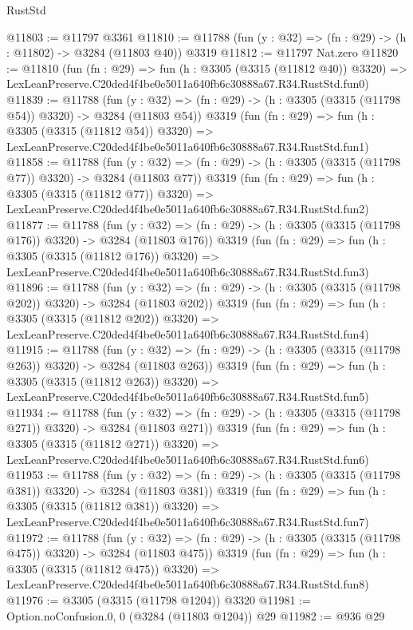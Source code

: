 \begin{lexlean}{RustStd}
\begin{coremodule}
@11803 := @11797 @3361
@11810 := @11788 (fun (y : @32) => (fn : @29) -> (h : @11802) -> @3284 (@11803 @40)) @3319
@11812 := @11797 Nat.zero
@11820 := @11810
    (fun (fn : @29) =>
    fun (h : @3305 (@3315 (@11812 @40)) @3320) =>
    LexLeanPreserve.C20ded4f4be0e5011a640fb6c30888a67.R34.RustStd.fun0)
@11839 := @11788
    (fun (y : @32) => (fn : @29) -> (h : @3305 (@3315 (@11798 @54)) @3320) -> @3284 (@11803 @54))
    @3319
    (fun (fn : @29) =>
    fun (h : @3305 (@3315 (@11812 @54)) @3320) =>
    LexLeanPreserve.C20ded4f4be0e5011a640fb6c30888a67.R34.RustStd.fun1)
@11858 := @11788
    (fun (y : @32) => (fn : @29) -> (h : @3305 (@3315 (@11798 @77)) @3320) -> @3284 (@11803 @77))
    @3319
    (fun (fn : @29) =>
    fun (h : @3305 (@3315 (@11812 @77)) @3320) =>
    LexLeanPreserve.C20ded4f4be0e5011a640fb6c30888a67.R34.RustStd.fun2)
@11877 := @11788
    (fun (y : @32) => (fn : @29) -> (h : @3305 (@3315 (@11798 @176)) @3320) -> @3284 (@11803 @176))
    @3319
    (fun (fn : @29) =>
    fun (h : @3305 (@3315 (@11812 @176)) @3320) =>
    LexLeanPreserve.C20ded4f4be0e5011a640fb6c30888a67.R34.RustStd.fun3)
@11896 := @11788
    (fun (y : @32) => (fn : @29) -> (h : @3305 (@3315 (@11798 @202)) @3320) -> @3284 (@11803 @202))
    @3319
    (fun (fn : @29) =>
    fun (h : @3305 (@3315 (@11812 @202)) @3320) =>
    LexLeanPreserve.C20ded4f4be0e5011a640fb6c30888a67.R34.RustStd.fun4)
@11915 := @11788
    (fun (y : @32) => (fn : @29) -> (h : @3305 (@3315 (@11798 @263)) @3320) -> @3284 (@11803 @263))
    @3319
    (fun (fn : @29) =>
    fun (h : @3305 (@3315 (@11812 @263)) @3320) =>
    LexLeanPreserve.C20ded4f4be0e5011a640fb6c30888a67.R34.RustStd.fun5)
@11934 := @11788
    (fun (y : @32) => (fn : @29) -> (h : @3305 (@3315 (@11798 @271)) @3320) -> @3284 (@11803 @271))
    @3319
    (fun (fn : @29) =>
    fun (h : @3305 (@3315 (@11812 @271)) @3320) =>
    LexLeanPreserve.C20ded4f4be0e5011a640fb6c30888a67.R34.RustStd.fun6)
@11953 := @11788
    (fun (y : @32) => (fn : @29) -> (h : @3305 (@3315 (@11798 @381)) @3320) -> @3284 (@11803 @381))
    @3319
    (fun (fn : @29) =>
    fun (h : @3305 (@3315 (@11812 @381)) @3320) =>
    LexLeanPreserve.C20ded4f4be0e5011a640fb6c30888a67.R34.RustStd.fun7)
@11972 := @11788
    (fun (y : @32) => (fn : @29) -> (h : @3305 (@3315 (@11798 @475)) @3320) -> @3284 (@11803 @475))
    @3319
    (fun (fn : @29) =>
    fun (h : @3305 (@3315 (@11812 @475)) @3320) =>
    LexLeanPreserve.C20ded4f4be0e5011a640fb6c30888a67.R34.RustStd.fun8)
@11976 := @3305 (@3315 (@11798 @1204)) @3320
@11981 := Option.noConfusion.{0, 0} (@3284 (@11803 @1204)) @29
@11982 := @936 @29

\end{coremodule}
\end{lexlean}
